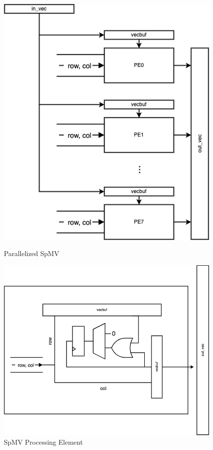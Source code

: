 \documentclass[10pt]{article}
\begin{document}
\begin{figure}[h!]
  \centering
  \begin{minipage}[t]{0.48\textwidth}
    \centering
    \includegraphics[width=\textwidth]{spmv_diagram.png}
    \caption{Parallelized SpMV}
    \label{fig:spmv_diagram}
  \end{minipage}
  \hfill
  \begin{minipage}[t]{0.48\textwidth}
    \centering
    \includegraphics[width=\textwidth]{pe_diagram.png}
    \caption{SpMV Processing Element}
    \label{fig:pe_diagram}
  \end{minipage}
\end{figure}
\end{document}
